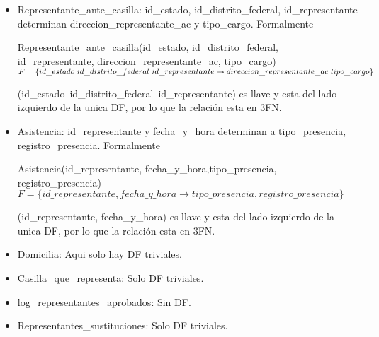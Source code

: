 \documentclass[a4paper,twoside,11pt]{article}
\begin{document}
\begin{itemize}
  \item Representante\_ante\_casilla: id\_estado, id\_distrito\_federal, id\_representante determinan
        direccion\_representante\_ac y tipo\_cargo. Formalmente

        Representante\_ante\_casilla(id\_estado, id\_distrito\_federal, id\_representante,
        direccion\_representante\_ac, tipo\_cargo)\\
        $F=\{id\_estado~id\_distrito\_federal~id\_representante\rightarrow\\
        direccion\_representante\_ac~tipo\_cargo\}$

        (id\_estado~id\_distrito\_federal~id\_representante) es llave y esta del lado izquierdo de la unica DF,
        por lo que la relación esta en 3FN.

  \item Asistencia: id\_representante y fecha\_y\_hora determinan a tipo\_presencia, registro\_presencia. Formalmente

        Asistencia(id\_representante, fecha\_y\_hora,tipo\_presencia, registro\_presencia)\\
        $F=\{id\_representante, fecha\_y\_hora \rightarrow tipo\_presencia, registro\_presencia\}$

        (id\_representante, fecha\_y\_hora) es llave y esta del lado izquierdo de la unica DF,
        por lo que la relación esta en 3FN.
        
  \item Domicilia: Aqui solo hay DF triviales.
  \item Casilla\_que\_representa: Solo DF triviales.
  \item log\_representantes\_aprobados: Sin DF.
  \item Representantes\_sustituciones: Solo DF triviales.

\end{itemize}
\end{document}
